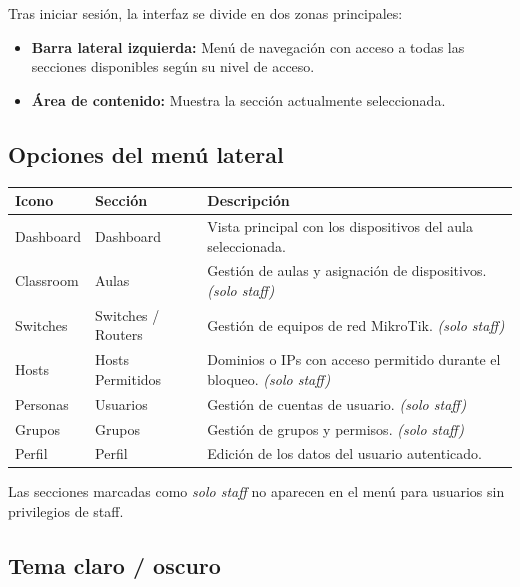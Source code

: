 \documentclass[12pt,a4paper]{article}
\begin{document}
Tras iniciar sesión, la interfaz se divide en dos zonas principales:

\begin{itemize}
    \item \textbf{Barra lateral izquierda:} Menú de navegación con acceso a todas las secciones disponibles según su nivel de acceso.
    \item \textbf{Área de contenido:} Muestra la sección actualmente seleccionada.
\end{itemize}

\subsection{Opciones del menú lateral}

\begin{table}[H]
\centering
\begin{tabularx}{\textwidth}{llX}
    \toprule
    \textbf{Icono} & \textbf{Sección} & \textbf{Descripción} \\
    \midrule
    Dashboard      & Dashboard            & Vista principal con los dispositivos del aula seleccionada. \\
    Classroom      & Aulas                & Gestión de aulas y asignación de dispositivos. \textit{(solo staff)} \\
    Switches       & Switches / Routers   & Gestión de equipos de red MikroTik. \textit{(solo staff)} \\
    Hosts          & Hosts Permitidos     & Dominios o IPs con acceso permitido durante el bloqueo. \textit{(solo staff)} \\
    Personas       & Usuarios             & Gestión de cuentas de usuario. \textit{(solo staff)} \\
    Grupos         & Grupos               & Gestión de grupos y permisos. \textit{(solo staff)} \\
    Perfil         & Perfil               & Edición de los datos del usuario autenticado. \\
    \bottomrule
\end{tabularx}
\end{table}

Las secciones marcadas como \textit{solo staff} no aparecen en el menú para usuarios sin privilegios de staff.

\subsection{Tema claro / oscuro}
\end{document}
